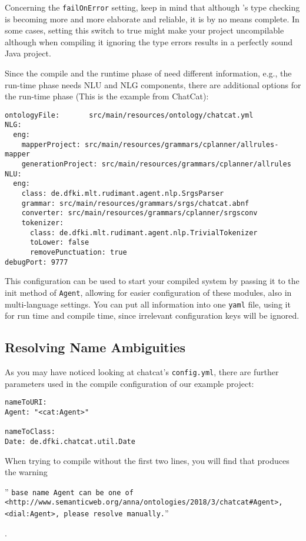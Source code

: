 Concerning the \texttt{failOnError} setting, keep in mind that
although \vonda's type checking is becoming more and more elaborate
and reliable, it is by no means complete. In some cases, setting this
switch to true might make your project uncompilable although when
compiling it ignoring the type errors results in a perfectly sound
Java project.

Since the compile and the runtime phase of \vonda need different information,
e.g., the run-time phase needs NLU and NLG components, there are additional
options for the run-time phase (This is the example from ChatCat):

\begin{verbatim}
ontologyFile:       src/main/resources/ontology/chatcat.yml
NLG:
  eng:
    mapperProject: src/main/resources/grammars/cplanner/allrules-mapper
    generationProject: src/main/resources/grammars/cplanner/allrules
NLU:
  eng:
    class: de.dfki.mlt.rudimant.agent.nlp.SrgsParser
    grammar: src/main/resources/grammars/srgs/chatcat.abnf
    converter: src/main/resources/grammars/cplanner/srgsconv
    tokenizer:
      class: de.dfki.mlt.rudimant.agent.nlp.TrivialTokenizer
      toLower: false
      removePunctuation: true
debugPort: 9777
\end{verbatim}

This configuration can be used to start your compiled system by passing it to
the init method of \texttt{Agent}, allowing for easier configuration of these
modules, also in multi-language settings. You can put all information into one
\texttt{yaml} file, using it for run time and compile time, since irrelevant
configuration keys will be ignored.

\subsection{Resolving Name Ambiguities} \label{sec:nsAmbigue}

As you may have noticed looking at chatcat's \texttt{config.yml}, there are
further parameters used in the compile configuration of our example project:

\begin{verbatim}
nameToURI:
Agent: "<cat:Agent>"

nameToClass:
Date: de.dfki.chatcat.util.Date
\end{verbatim}

When trying to compile without the first two lines, you will find that \vonda
produces the warning \begin{small}'' \texttt{base name Agent can be one of
    <http://www.semanticweb.org/anna/ontologies/2018/3/chatcat\#Agent>,
    <dial:Agent>, please resolve manually.}''
\end{small}.

